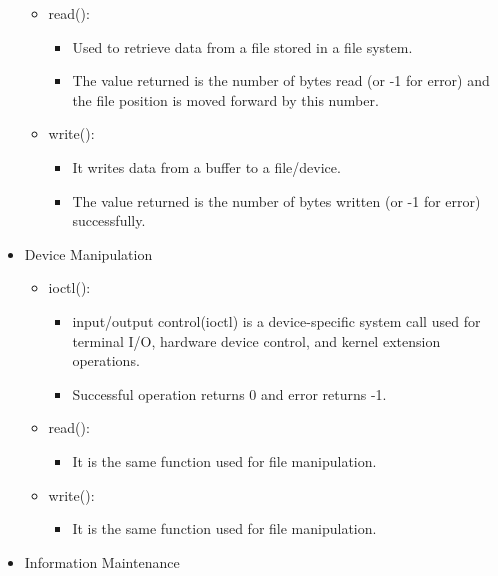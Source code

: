 \begin{itemize}
\begin{itemize}
\begin{itemize}
                \end{itemize}
            \item read():
                \begin{itemize}
                    \item Used to retrieve data from a file stored in a file system.
                    \item The value returned is the number of bytes read (or -1 for error) and the file position is moved forward by this number.
                \end{itemize}
            \item write():
                \begin{itemize}
                    \item It writes data from a buffer to a file/device.
                    \item The value returned is the number of bytes written (or -1 for error) successfully.
                \end{itemize}
        \end{itemize}
    \item Device Manipulation
        \begin{itemize}
            \item ioctl():
                \begin{itemize}
                    \item input/output control(ioctl) is a device-specific system call used for terminal I/O, hardware device control, and kernel extension operations.
                    \item Successful operation returns 0 and error returns -1.
                \end{itemize}
            \item read():
                \begin{itemize}
                    \item It is the same function used for file manipulation.
                \end{itemize} 
            \item write():
                \begin{itemize}
                    \item It is the same function used for file manipulation.
                \end{itemize}
        \end{itemize}
    \item Information Maintenance
        \begin{itemize}

\end{itemize}
\end{itemize}
